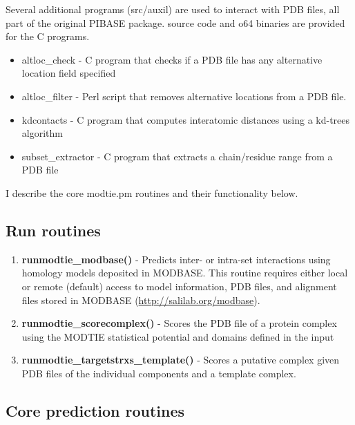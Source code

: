 \documentclass[11pt]{article}
\begin{document}
Several additional programs (src/auxil) are used to interact with PDB files, all part of the original PIBASE package. source code and o64 binaries are provided for the C programs.
\begin{itemize}
   \item altloc\_check - C program that checks if a PDB file has any alternative location field specified
   \item altloc\_filter - Perl script that removes alternative locations from a PDB file.
   \item kdcontacts - C program that computes interatomic distances using a kd-trees algorithm
   \item subset\_extractor - C program that extracts a chain/residue range from a PDB file
\end{itemize}

I describe the core modtie.pm routines and their functionality below.

\subsection{Run routines}

\begin{enumerate}
\item {\bf runmodtie\_modbase()} - Predicts inter- or intra-set interactions using homology models deposited in MODBASE. This routine requires either local or remote (default) access to model information, PDB files, and alignment files stored in MODBASE (\url{http://salilab.org/modbase}).

\item {\bf runmodtie\_scorecomplex()} - Scores the PDB file of a protein complex using the MODTIE statistical potential and domains defined in the input

\item {\bf runmodtie\_targetstrxs\_template()} - Scores a putative complex given PDB files of the individual components and a template complex.

\end{enumerate}

\subsection{Core prediction routines}
\end{document}
